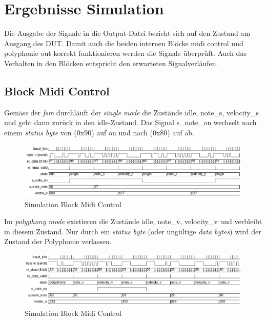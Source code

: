 \section{Ergebnisse Simulation}\label{sec.ergebnisse_tests}
Die Ausgabe der Signale in die Output-Datei bezieht sich auf den Zustand am Ausgang des DUT. Damit auch die beiden internen Blöcke midi control und polyphonie out korrekt funktionieren werden die Signale überprüft. Auch das Verhalten in den Blöcken entspricht den erwarteten Signalverläufen.\\

\subsection{Block Midi Control}
Gemäss der \textit{fsm} durchläuft der \textit{single mode}  die Zustände idle, note\_s, velocity\_s und geht dann zurück  in den idle-Zustand. Das Signal s\_note\_on wechselt nach einem \textit{status byte} von (0x90) auf on und nach (0x80) auf ab.
\begin{figure}[H]
	\centering
	\includegraphics[width=1\textwidth]{images/midi_control/wave_single.png}
	\caption{Simulation Block Midi Control}
	\label{fig.test_midi:control_single}
\end{figure} 

Im \textit{polyphony mode} existieren die Zustände idle, note\_v, velocity\_v und verbleibt in diesem Zustand. Nur durch ein \textit{status byte} (oder ungültige \textit{data bytes}) wird der Zustand der Polyphonie verlassen.

\begin{figure}[H]
	\centering
	\includegraphics[width=1\textwidth]{images/midi_control/wave_polyphonie.png}
	\caption{Simulation Block Midi Control}
	\label{fig.test_midi:control}
\end{figure} 

